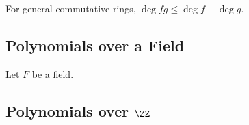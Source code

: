 \begin{remark}
For general commutative rings, $\deg fg\le \deg f+\deg g$.
\end{remark}

\subsection{Polynomials over a Field}
Let $F$ be a field.

\subsection{Polynomials over $\ZZ$}